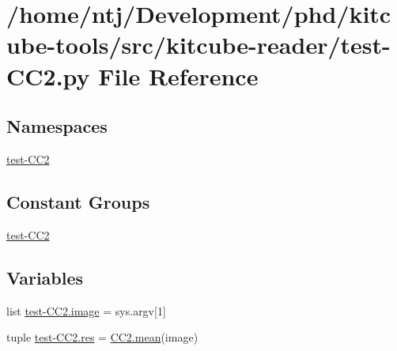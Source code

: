 \hypertarget{test-CC2_8py}{\section{/home/ntj/\-Development/phd/kitcube-\/tools/src/kitcube-\/reader/test-\/\-C\-C2.py File Reference}
\label{test-CC2_8py}
}
\subsection*{Namespaces}
\begin{DoxyCompactItemize}
\item 
\hyperlink{namespacetest-CC2}{test-\/\-C\-C2}
\end{DoxyCompactItemize}
\subsection*{Constant Groups}
\begin{DoxyCompactItemize}
\item 
\hyperlink{namespacetest-CC2}{test-\/\-C\-C2}
\end{DoxyCompactItemize}
\subsection*{Variables}
\begin{DoxyCompactItemize}
\item 
list \hyperlink{namespacetest-CC2_a6dd071a29131dcbd6ebf88f5ca28cedf}{test-\/\-C\-C2.\-image} = sys.\-argv\mbox{[}1\mbox{]}
\item 
tuple \hyperlink{namespacetest-CC2_ab40323d3e60749e1638b27277dc7f80e}{test-\/\-C\-C2.\-res} = \hyperlink{namespaceCC2_a8853f025a8480150d1fea2e730384a39}{C\-C2.\-mean}(image)
\end{DoxyCompactItemize}
